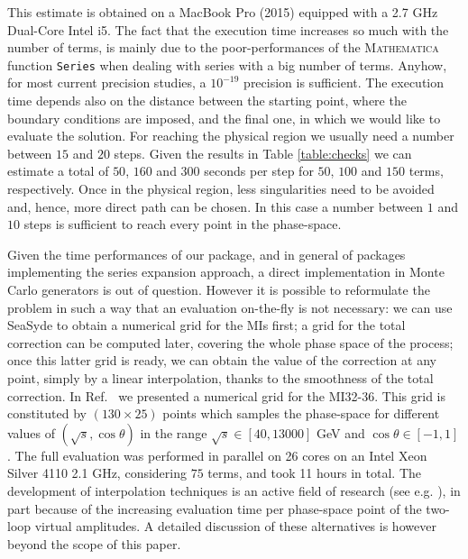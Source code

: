 \documentclass[final,1p,times]{elsarticle}
\begin{document}
This estimate is obtained on a MacBook Pro (2015) equipped with a 2.7 GHz Dual-Core Intel i5. The fact that the execution time increases so much with the number of terms, is mainly due to the poor-performances of the \textsc{Mathematica} function \texttt{Series} when dealing with series with a big number of terms. Anyhow, for most current precision studies, a $10^{-19}$ precision is sufficient. The execution time depends also on the distance between the starting point, where the boundary conditions are imposed, and the final one, in which we would like to evaluate the solution. For reaching the physical region we usually need a number between $15$ and $20$ steps. Given the results in Table \ref{table:checks} we can estimate a total of $50$, $160$ and $300$ seconds per step for $50$, $100$ and $150$ terms, respectively.
Once in the physical region, less singularities need to be avoided and, hence, more direct path can be chosen. In this case a number between $1$ and $10$ steps is sufficient to reach every point in the phase-space.

Given the time performances of our package, and in general of packages implementing the series expansion approach, a direct implementation in Monte Carlo generators is out of question.
However it is possible to reformulate the problem in such a way that an evaluation on-the-fly is not necessary: we can use {\sc SeaSyde} to obtain a numerical grid for the MIs first; a grid for the total correction can be computed later, covering the whole phase space of the process;
once this latter grid is ready, we can obtain the value of the correction at any point, simply by a linear interpolation, thanks to the smoothness of the total correction.
In Ref.~\cite{Armadillo:2022bgm} we presented a numerical grid for the MI32-36. This grid is constituted by $(130\times25)$ points which samples the phase-space for different values of $(\sqrt{s},\cos\theta)$ in the range $\sqrt{s}\in [40,13000 ] $ GeV and $\cos\theta\in[-1,1]$. The full evaluation was performed in parallel on 26 cores on an Intel Xeon Silver 4110 2.1 GHz, considering $75$ terms, and took 11 hours in total. 
  The development of interpolation techniques is an active field of research
  (see e.g. \cite{Chawdhry:2019bji,Bishara:2019iwh,Winterhalder:2021ngy} ),
  in part because of the increasing evaluation time per phase-space point of the two-loop virtual amplitudes.
  A detailed discussion of these alternatives is however beyond the scope of this paper.
\end{document}

